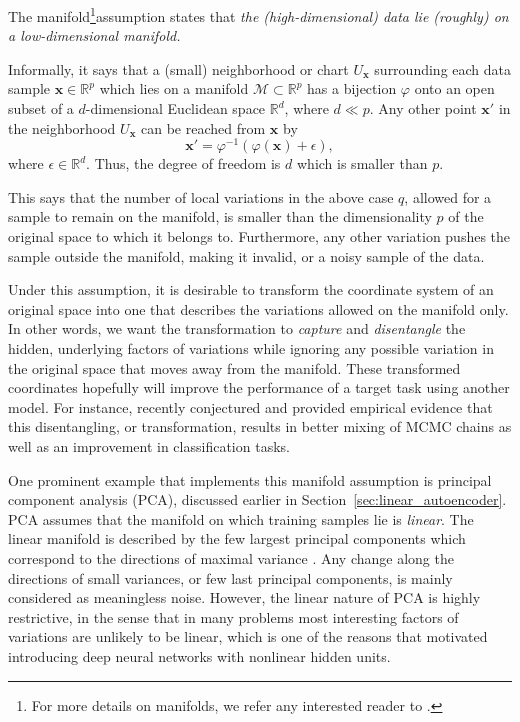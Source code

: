 \documentclass[dissertation,nocontribution]{aaltoseries}
\newcommand{\vect}[1]{\mathbf{#1}}
\newcommand{\vx}[0]{\vect{x}}
\newcommand{\RR}[0]{\mathbb{R}}
\newcommand{\MM}[0]{\mathcal{M}}
\begin{document}
The manifold\footnote{ For more details on manifolds, we refer any
interested reader to \citep{Absil2008}.}assumption \citep{Chapelle2006} states
that
\textit{
the (high-dimensional) data lie (roughly) on a
low-dimensional manifold.
}

Informally, it says that a (small) neighborhood or chart
$U_\vx$ surrounding each data sample $\vx \in \RR^p$ which
lies on a manifold $\MM \subset \RR^p$ has a bijection
$\varphi$ onto an open subset of a $d$-dimensional Euclidean
space $\RR^d$, where $d \ll p$.
Any other point $\vx'$ in the neighborhood $U_\vx$ can be
reached from $\vx$ by 
\[
\vx' = \varphi^{-1} \left( \varphi(\vx) + \epsilon \right),
\]
where $\epsilon \in \RR^d$. Thus, the degree of freedom is
$d$ which is smaller than $p$.

This says that the number of local variations in the above case
$q$, allowed for a sample to remain on the manifold, is smaller
than the dimensionality $p$ of the original space to which it
belongs to. Furthermore, any other variation pushes the sample
outside the manifold, making it invalid, or a noisy sample of the
data.

Under this assumption, it is desirable to transform the
coordinate system of an original space into one that
describes the variations allowed on the manifold only. In
other words, we want the transformation to \textit{capture}
and \textit{disentangle} the hidden, underlying factors of
variations \citep{Bengio2009a} while ignoring any possible
variation in the original space that moves away from the
manifold. These transformed coordinates hopefully will
improve the performance of a target task using another
model. For instance, \citet{Bengio2013} recently
conjectured and provided empirical evidence that this
disentangling, or transformation, results in better mixing
of MCMC chains as well as an improvement in classification
tasks.

One prominent example that implements this
manifold assumption is principal component analysis
(PCA), discussed earlier in
Section~\ref{sec:linear_autoencoder}. PCA assumes that
the manifold on which training samples lie is
\textit{linear}. The linear manifold is described by the few
largest principal components which correspond to the
directions of maximal variance \citep[see,
e.g.,][]{Bishop2006}. Any change along the directions of small variances, or
few last principal components, is mainly considered as
meaningless
noise. However, the linear nature of PCA is highly
restrictive, in the sense that in many problems most interesting factors of
variations are unlikely to be linear, which is one of the
reasons that motivated introducing deep neural networks with
nonlinear hidden units.
\end{document}
